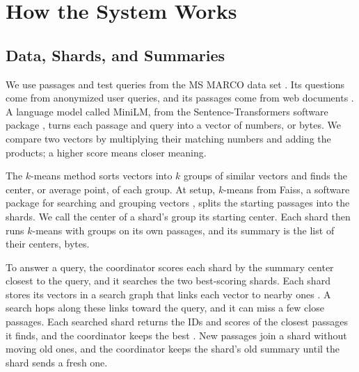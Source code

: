 \section{How the System Works}
\label{sec:system}

\subsection{Data, Shards, and Summaries}

We use \RNumCorpusTotalPassages{} passages and \RNumPlainTestQueries{} test queries from the MS MARCO data set \cite{nguyen2016msmarco}.
Its questions come from anonymized user queries, and its passages come from web documents \cite{nguyen2016msmarco}.
A language model called MiniLM, from the Sentence-Transformers software package \cite{reimers2019sbert}, turns each passage and query into a vector of \RNumVectorDimFloats{} numbers, or \RNumPlainVectorBytes{} bytes.
We compare two vectors by multiplying their matching numbers and adding the products; a higher score means closer meaning.

The $k$-means method sorts vectors into $k$ groups of similar vectors and finds the center, or average point, of each group.
At setup, $k$-means from Faiss, a software package for searching and grouping vectors \cite{douze2024faiss}, splits the starting passages into the \RNumNumShards{} shards.
We call the center of a shard's group its starting center.
Each shard then runs $k$-means with \RNumCentersPerSummary{} groups on its own passages, and its summary is the list of their centers, \RNumSummaryBytes{} bytes.

To answer a query, the coordinator scores each shard by the summary center closest to the query, and it searches the two best-scoring shards.
Each shard stores its vectors in a search graph that links each vector to nearby ones \cite{malkov2020hnsw}.
A search hops along these links toward the query, and it can miss a few close passages.
Each searched shard returns the IDs and scores of the \RNumPlainTopK{} closest passages it finds, and the coordinator keeps the best \RNumPlainTopK{}.
New passages join a shard without moving old ones, and the coordinator keeps the shard's old summary until the shard sends a fresh one.

